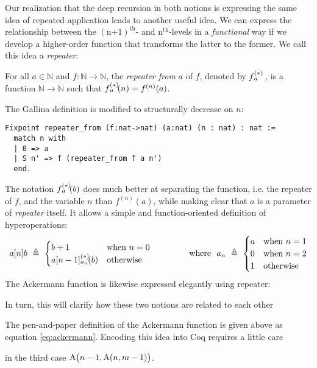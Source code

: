 Our realization that the deep recursion in both notions is expressing the same idea
of repeated application leads to another useful idea.  We can express the relationship 
between the $(\text{n+1})^{\text{th}}$- and $\text{n}^{\text{th}}$-levels in 
a \emph{functional} way if we develop a higher-order function that transforms the latter 
to the former.  We call this idea a \emph{repeater}:
\begin{defn}
For all $a\in \mathbb{N}$ and $f: \mathbb{N}\to \mathbb{N}$, the \emph{repeater from} $a$ of $f$, denoted by $\rf{f}{a}$ , is a function $\mathbb{N}\to \mathbb{N}$ such that $\rf{f}{a}(n) = f^{(n)}(a)$.
\end{defn}
The Gallina definition is modified to structurally decrease on $n$:
\begin{lstlisting}
Fixpoint repeater_from (f:nat->nat) (a:nat) (n : nat) : nat :=
  match n with
  | 0 => a
  | S n' => f (repeater_from f a n')
  end.
\end{lstlisting}
The notation $\rf{f}{a}(b)$ does much better at separating the function, i.e. the repeater of $f$, and the variable $n$ than $f^{(n)}(a)$, while making clear that $a$ is a parameter of \emph{repeater} itself. It allows a simple and function-oriented definition of hyperoperations:
\begin{equation*}
a[n]b ~ \triangleq ~ \begin{cases}
b + 1 & \text{when } n = 0 \\
\rf{a[n-1]}{a_n}(b) & \text{otherwise}
\end{cases}
\qquad \qquad \text{ where } \ a_n ~ \triangleq ~ \begin{cases}
a & \text{when } n = 1 \\
0 & \text{when } n = 2 \\
1 & \text{otherwise}
\end{cases}
\end{equation*}
The Ackermann function is likewise expressed elegantly using repeater:



In turn, this will clarify how these two notions are
related to each other


The pen-and-paper definition of the Ackermann function is given above as equation \eqref{eq:ackermann}.  Encoding this idea into Coq requires a little care 

 in the third case $\text{A}\big(n-1,\text{A}(n,m-1)\big)$.  
 
 


